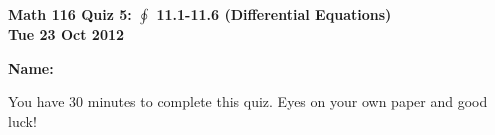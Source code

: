 \documentclass[11pt,letterpaper]{article}
\begin{document}
\flushleft
\begin{multicols}{2}

\begin{large}\textbf{Math 116 Quiz 5: $\oint$ 11.1-11.6 (Differential Equations) \\
Tue 23 Oct 2012}\end{large}

\textbf{Name:  }\underline{\hspace{4pc}{\bf SOLUTIONS}\hspace{4pc}}

\vspace{.5in}

\end{multicols}

\pagestyle{empty}


\flushleft

You have 30 minutes to complete this quiz.  Eyes on your own paper and good luck!
\end{document}
